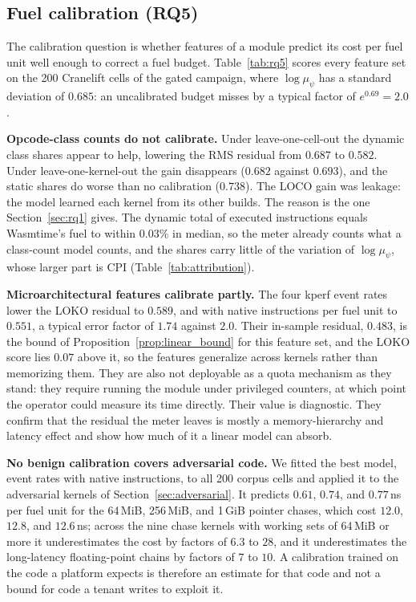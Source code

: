 \documentclass{ws-jcsc}
\begin{document}
\subsection{Fuel calibration (RQ5)}
\label{sec:rq5}
The calibration question is whether features of a module predict its cost per fuel unit well enough to correct a fuel budget. Table~\ref{tab:rq5} scores every feature set on the 200 Cranelift cells of the gated campaign, where $\log\mu_\psi$ has a standard deviation of $0.685$: an uncalibrated budget misses by a typical factor of $e^{0.69}=2.0$.

\textbf{Opcode-class counts do not calibrate.} Under leave-one-cell-out the dynamic class shares appear to help, lowering the RMS residual from $0.687$ to $0.582$. Under leave-one-kernel-out the gain disappears ($0.682$ against $0.693$), and the static shares do worse than no calibration ($0.738$). The LOCO gain was leakage: the model learned each kernel from its other builds. The reason is the one Section~\ref{sec:rq1} gives. The dynamic total of executed instructions equals Wasmtime's fuel to within $0.03\%$ in median, so the meter already counts what a class-count model counts, and the shares carry little of the variation of $\log\mu_\psi$, whose larger part is CPI (Table~\ref{tab:attribution}).

\textbf{Microarchitectural features calibrate partly.} The four kperf event rates lower the LOKO residual to $0.589$, and with native instructions per fuel unit to $0.551$, a typical error factor of $1.74$ against $2.0$. Their in-sample residual, $0.483$, is the bound of Proposition~\ref{prop:linear_bound} for this feature set, and the LOKO score lies $0.07$ above it, so the features generalize across kernels rather than memorizing them. They are also not deployable as a quota mechanism as they stand: they require running the module under privileged counters, at which point the operator could measure its time directly. Their value is diagnostic. They confirm that the residual the meter leaves is mostly a memory-hierarchy and latency effect and show how much of it a linear model can absorb.

\textbf{No benign calibration covers adversarial code.} We fitted the best model, event rates with native instructions, to all 200 corpus cells and applied it to the adversarial kernels of Section~\ref{sec:adversarial}. It predicts $0.61$, $0.74$, and $0.77$\,ns per fuel unit for the 64\,MiB, 256\,MiB, and 1\,GiB pointer chases, which cost $12.0$, $12.8$, and $12.6$\,ns; across the nine chase kernels with working sets of 64\,MiB or more it underestimates the cost by factors of $6.3$ to $28$, and it underestimates the long-latency floating-point chains by factors of $7$ to $10$. A calibration trained on the code a platform expects is therefore an estimate for that code and not a bound for code a tenant writes to exploit it.
\end{document}
